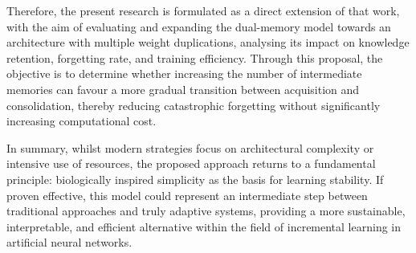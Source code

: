 Therefore, the present research is formulated as a direct extension of that work, with the aim of evaluating and expanding the dual-memory model towards an architecture with multiple weight duplications, analysing its impact on knowledge retention, forgetting rate, and training efficiency. 
Through this proposal, the objective is to determine whether increasing the number of intermediate memories can favour a more gradual transition between acquisition and consolidation, thereby reducing catastrophic forgetting without significantly increasing computational cost.

In summary, whilst modern strategies focus on architectural complexity or intensive use of resources, the proposed approach returns to a fundamental principle: biologically inspired simplicity as the basis for learning stability. 
If proven effective, this model could represent an intermediate step between traditional approaches and truly adaptive systems, providing a more sustainable, interpretable, and efficient alternative within the field of incremental learning in artificial neural networks.
